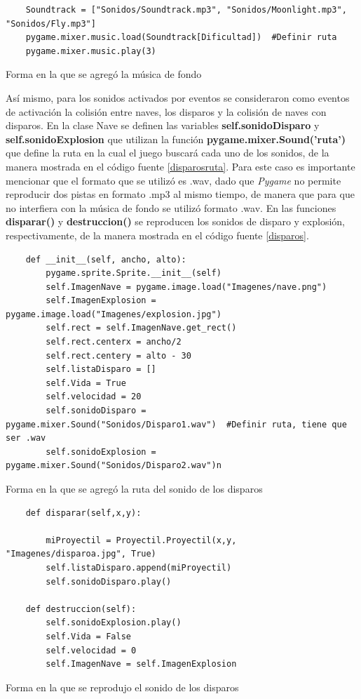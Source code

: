 \documentclass[12pt,letterpaper]{article}
\begin{document}
\begin{listing}[H]
\begin{verbatim}
    Soundtrack = ["Sonidos/Soundtrack.mp3", "Sonidos/Moonlight.mp3", "Sonidos/Fly.mp3"]
    pygame.mixer.music.load(Soundtrack[Dificultad])  #Definir ruta
    pygame.mixer.music.play(3)
\end{verbatim}
\caption{Forma en la que se agregó la música de fondo}
\label{music}
\end{listing}

Así mismo, para los sonidos activados por eventos se consideraron como eventos de activación la colisión entre naves, los disparos y la colisión de naves con disparos. En la clase Nave se definen las variables \textbf{self.sonidoDisparo} y \textbf{self.sonidoExplosion} que utilizan la función \textbf{pygame.mixer.Sound('ruta')} que define la ruta en la cual el juego buscará cada uno de los sonidos, de la manera mostrada en el código fuente \ref{disparosruta}.
Para este caso es importante mencionar que el formato que se utilizó es .wav, dado que \textit{Pygame} no permite reproducir dos pistas en formato .mp3 al mismo tiempo, de manera que para que no interfiera con la música de fondo se utilizó formato .wav. En las funciones \textbf{disparar()} y  \textbf{destruccion()} se reproducen los sonidos de disparo y explosión, respectivamente, de la manera mostrada en el código fuente \ref{disparos}. 


\begin{listing}[H]
\begin{verbatim}
    def __init__(self, ancho, alto):
        pygame.sprite.Sprite.__init__(self)
        self.ImagenNave = pygame.image.load("Imagenes/nave.png")
        self.ImagenExplosion = pygame.image.load("Imagenes/explosion.jpg")
        self.rect = self.ImagenNave.get_rect()
        self.rect.centerx = ancho/2
        self.rect.centery = alto - 30
        self.listaDisparo = []
        self.Vida = True
        self.velocidad = 20
        self.sonidoDisparo = pygame.mixer.Sound("Sonidos/Disparo1.wav")  #Definir ruta, tiene que ser .wav
        self.sonidoExplosion = pygame.mixer.Sound("Sonidos/Disparo2.wav")n
\end{verbatim}
\caption{Forma en la que se agregó la ruta del sonido de los disparos}
\label{disparosruta}
\end{listing}

\begin{listing}[H]
\begin{verbatim}
    def disparar(self,x,y):

        miProyectil = Proyectil.Proyectil(x,y, "Imagenes/disparoa.jpg", True)
        self.listaDisparo.append(miProyectil)
        self.sonidoDisparo.play()

    def destruccion(self):
        self.sonidoExplosion.play()
        self.Vida = False
        self.velocidad = 0
        self.ImagenNave = self.ImagenExplosion
\end{verbatim}
\caption{Forma en la que se reprodujo el sonido de los disparos}
\label{disparos}
\end{listing}
\end{document}
